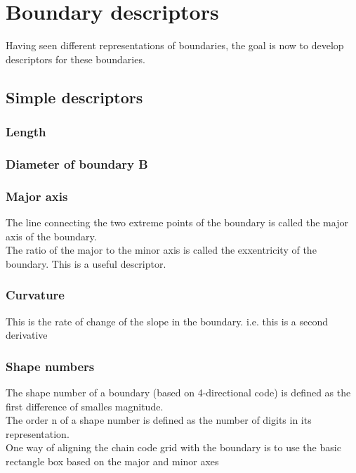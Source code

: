 \section{Boundary descriptors}
Having seen different representations of boundaries, the goal is now to develop descriptors for these boundaries.
\subsection{Simple descriptors}
\subsubsection{Length}
\subsubsection{Diameter of boundary B}
\subsubsection{Major axis}
The line connecting the two extreme points of the boundary is called the major axis of the boundary.\\
The ratio of the major to the minor axis is called the exxentricity of the boundary. This is a useful descriptor.
\subsubsection{Curvature}
This is the rate of change of the slope in the boundary. i.e. this is a second derivative
\subsubsection{Shape numbers}
The shape number of a boundary (based on 4-directional code) is defined as the first difference of smalles magnitude.\\
The order n of a shape number is defined as the number of digits in its representation.\\
One way of aligning the chain code grid with the boundary is to use the basic rectangle box based on the major and minor axes\\

